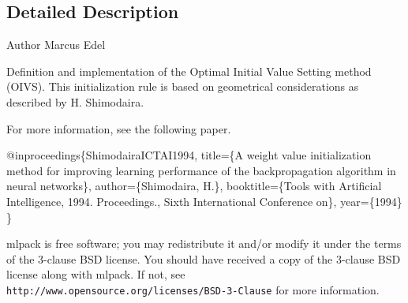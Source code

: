 \subsection{Detailed Description}
\begin{DoxyAuthor}{Author}
Marcus Edel
\end{DoxyAuthor}
Definition and implementation of the Optimal Initial Value Setting method (O\+I\+VS). This initialization rule is based on geometrical considerations as described by H. Shimodaira.

For more information, see the following paper.


\begin{DoxyCode}
@inproceedings\{ShimodairaICTAI1994,
  title=\{A weight value initialization method \textcolor{keywordflow}{for} improving learning
  performance of the backpropagation algorithm in neural networks\},
  author=\{Shimodaira, H.\},
  booktitle=\{Tools with Artificial Intelligence, 1994. Proceedings.,
  Sixth International Conference on\},
  year=\{1994\}
\}
\end{DoxyCode}


mlpack is free software; you may redistribute it and/or modify it under the terms of the 3-\/clause B\+SD license. You should have received a copy of the 3-\/clause B\+SD license along with mlpack. If not, see {\tt http\+://www.\+opensource.\+org/licenses/\+B\+S\+D-\/3-\/\+Clause} for more information. 